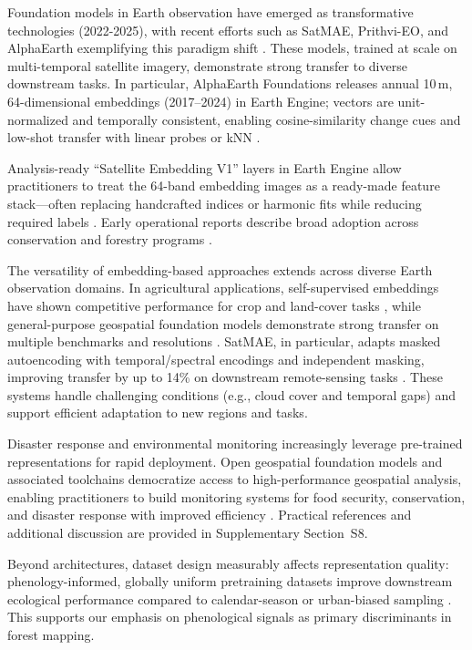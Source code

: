 \documentclass[utf8]{FrontiersinHarvard}
\begin{document}
Foundation models in Earth observation have emerged as transformative technologies (2022-2025), with recent efforts such as SatMAE, Prithvi-EO, and AlphaEarth exemplifying this paradigm shift \citep{Cong2022,Szwarcman2024PrithviEO2,AlphaEarth2025}. These models, trained at scale on multi-temporal satellite imagery, demonstrate strong transfer to diverse downstream tasks. In particular, AlphaEarth Foundations releases annual 10\,m, 64-dimensional embeddings (2017–2024) in Earth Engine; vectors are unit-normalized and temporally consistent, enabling cosine-similarity change cues and low-shot transfer with linear probes or kNN \citep{AlphaEarth2025}.

Analysis-ready “Satellite Embedding V1” layers in Earth Engine allow practitioners to treat the 64-band embedding images as a ready-made feature stack—often replacing handcrafted indices or harmonic fits while reducing required labels \citep{Google2025SatelliteEmbeddingV1}. Early operational reports describe broad adoption across conservation and forestry programs \citep{DeepMind2025AlphaEarth}.

The versatility of embedding-based approaches extends across diverse Earth observation domains. In agricultural applications, self-supervised embeddings have shown competitive performance for crop and land-cover tasks \citep{Cong2022}, while general-purpose geospatial foundation models demonstrate strong transfer on multiple benchmarks and resolutions \citep{Cha2023Billion,Khanna2023DiffusionSat,Xie2024FoundationEffective}. SatMAE, in particular, adapts masked autoencoding with temporal/spectral encodings and independent masking, improving transfer by up to 14\% on downstream remote-sensing tasks \citep{Cong2022}. These systems handle challenging conditions (e.g., cloud cover and temporal gaps) and support efficient adaptation to new regions and tasks.

Disaster response and environmental monitoring increasingly leverage pre-trained representations for rapid deployment. Open geospatial foundation models and associated toolchains democratize access to high-performance geospatial analysis, enabling practitioners to build monitoring systems for food security, conservation, and disaster response with improved efficiency \citep{Szwarcman2024PrithviEO2,Xie2024FoundationEffective,NatureGFM2025}. Practical references and additional discussion are provided in Supplementary Section~S8.

Beyond architectures, dataset design measurably affects representation quality: phenology-informed, globally uniform pretraining datasets improve downstream ecological performance compared to calendar-season or urban-biased sampling \citep{Plekhanova2025SSL4Eco}. This supports our emphasis on phenological signals as primary discriminants in forest mapping.
\end{document}
